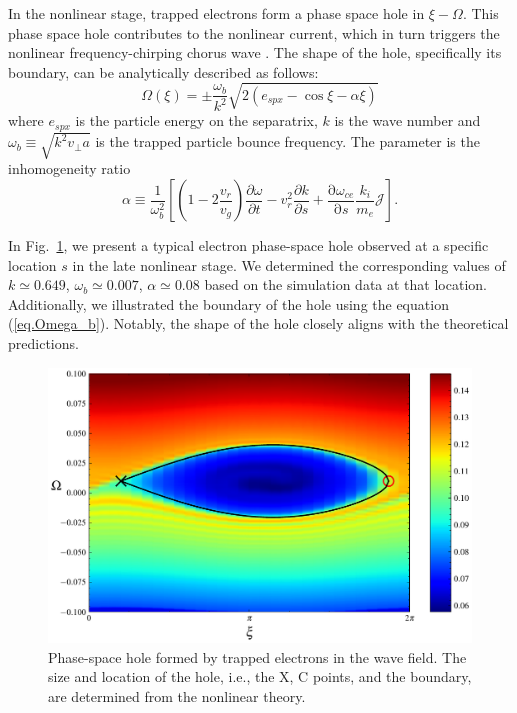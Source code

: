 In the nonlinear stage, trapped electrons form a phase space hole in $\xi-\Omega$. This phase space hole contributes to the nonlinear current, which in turn triggers the nonlinear frequency-chirping chorus wave \cite{omura2008}. The shape of the hole, specifically its boundary, can be analytically described as follows:
\begin{equation}\label{eq.Omega_b}
    \Omega(\xi) = \pm \frac{\omega_b}{k^2} \sqrt{2 (e_{spx}-\cos \xi - \alpha \xi)}
\end{equation}
where $e_{spx}$ is the particle energy on the separatrix, $k$ is the wave number and $\omega_b\equiv \sqrt{k^2 v_\perp a}$ is the trapped particle bounce frequency.
The parameter is the inhomogeneity ratio \cite{omura2008,tao2020}
\begin{equation}\label{eq.alp}
    \alpha \equiv \frac{1}{\omega_{b}^2}\left[\left(1 - 2\frac{v_r}{v_g}\right)\frac{\partial \omega}{\partial t}  -v_r^2 \frac{\partial k}{\partial s}+ \frac{\mathrm{\partial} \omega_{ce}}{\mathrm{\partial} s}\frac{k_i}{m_e}\mathcal{J}\right].
\end{equation}

In Fig.~\ref{fig.hole}, we present a typical electron phase-space hole observed at a specific location $s$ in the late nonlinear stage. We determined the corresponding values of $k \simeq 0.649$, $\omega_b \simeq 0.007$, $\alpha \simeq 0.08$ based on the simulation data at that location. Additionally, we illustrated the boundary of the hole using the equation (\ref{eq.Omega_b}). Notably, the shape of the hole closely aligns with the theoretical predictions.

\begin{figure}[htbp]
    \centering
    \includegraphics[scale=0.5]{cpc_img/fig_hole.pdf}
    \caption{Phase-space hole formed by trapped electrons in the wave field. The size and location of the hole, i.e., the X, C points, and the boundary, are determined from the nonlinear theory.}
    \label{fig.hole}
\end{figure}


